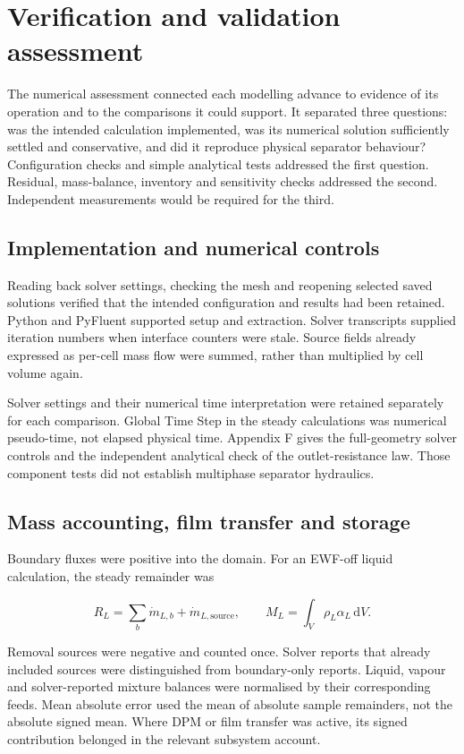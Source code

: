 \section{Verification and validation assessment}

The numerical assessment connected each modelling advance to evidence of its operation and to the comparisons it could support. It separated three questions: was the intended calculation implemented, was its numerical solution sufficiently settled and conservative, and did it reproduce physical separator behaviour? Configuration checks and simple analytical tests addressed the first question. Residual, mass-balance, inventory and sensitivity checks addressed the second. Independent measurements would be required for the third.

\subsection{Implementation and numerical controls}

Reading back solver settings, checking the mesh and reopening selected saved solutions verified that the intended configuration and results had been retained. Python and PyFluent supported setup and extraction. Solver transcripts supplied iteration numbers when interface counters were stale. Source fields already expressed as per-cell mass flow were summed, rather than multiplied by cell volume again.

Solver settings and their numerical time interpretation were retained separately for each comparison. Global Time Step in the steady calculations was numerical pseudo-time, not elapsed physical time. Appendix F gives the full-geometry solver controls and the independent analytical check of the outlet-resistance law. Those component tests did not establish multiphase separator hydraulics.

\subsection{Mass accounting, film transfer and storage}

Boundary fluxes were positive into the domain. For an EWF-off liquid calculation, the steady remainder was

\[R_L=\sum_b\dot m_{L,b}+\dot m_{L,\mathrm{source}},\qquad M_L=\int_V\rho_L\alpha_L\,\mathrm dV.\]

Removal sources were negative and counted once. Solver reports that already included sources were distinguished from boundary-only reports. Liquid, vapour and solver-reported mixture balances were normalised by their corresponding feeds. Mean absolute error used the mean of absolute sample remainders, not the absolute signed mean. Where DPM or film transfer was active, its signed contribution belonged in the relevant subsystem account.

